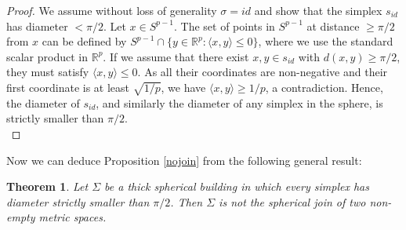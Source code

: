 \documentclass{article}
\theoremstyle{definition}
\theoremstyle{remark}
\theoremstyle{plain}
\newtheorem{thm}[dfn]{Theorem}
\begin{document}
\begin{proof}
    We assume without loss of generality $\sigma=id$ and show that the simplex $s_{id}$ has diameter $<\pi/2$. Let $x\in S^{p-1}$. The set of points in $S^{p-1}$ at distance $\geq\pi/2$ from $x$ can be defined by $S^{p-1}\cap\{y\in\mathbb{R}^p: \langle x,y\rangle\leq 0\}$, where we use the standard scalar product in $\mathbb{R}^p$. If we assume that there exist $x,y\in s_{id}$ with $d(x,y)\geq\pi/2$, they must satisfy $\langle x,y\rangle\leq 0$. As all their coordinates are non-negative and their first coordinate is at least $\sqrt{1/p}$, we have $\langle x,y\rangle\geq 1/p$, a contradiction. Hence, the diameter of $s_{id}$, and similarly the diameter of any simplex in the sphere, is strictly smaller than $\pi/2$. \\
\end{proof}

Now we can deduce Proposition \ref{nojoin} from the following general result:

\begin{thm}
    Let $\Sigma$ be a thick spherical building in which every simplex has diameter strictly smaller than $\pi/2$. Then $\Sigma$ is not the spherical join of two non-empty metric spaces.
\end{thm}
\end{document}
